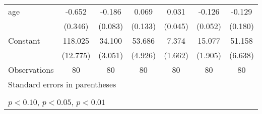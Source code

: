 \begin{table}[htbp]
\begin{tabular}{l*{6}{c}}
\addlinespace
age                 &      -0.652\sym{*}  &      -0.186\sym{**} &       0.069         &       0.031         &      -0.126\sym{**} &      -0.129         \\
                    &     (0.346)         &     (0.083)         &     (0.133)         &     (0.045)         &     (0.052)         &     (0.180)         \\
\addlinespace
Constant            &     118.025\sym{***}&      34.100\sym{***}&      53.686\sym{***}&       7.374\sym{***}&      15.077\sym{***}&      51.158\sym{***}\\
                    &    (12.775)         &     (3.051)         &     (4.926)         &     (1.662)         &     (1.905)         &     (6.638)         \\
\midrule
Observations        &          80         &          80         &          80         &          80         &          80         &          80         \\
\bottomrule
\multicolumn{7}{l}{\footnotesize Standard errors in parentheses}\\
\multicolumn{7}{l}{\footnotesize  }\\
\multicolumn{7}{l}{\footnotesize \sym{*} \(p<0.10\), \sym{**} \(p<0.05\), \sym{***} \(p<0.01\)}\\
\end{tabular}
\end{table}
